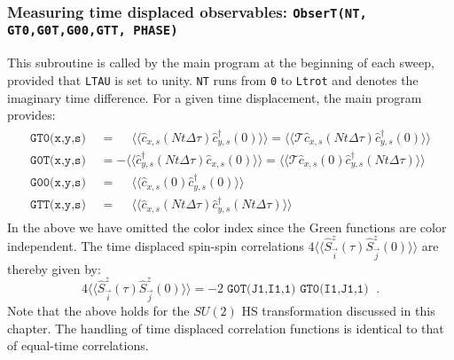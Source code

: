 \subsubsection{Measuring time displaced observables: \texttt{ObserT(NT,  GT0,G0T,G00,GTT, PHASE) }}
%
This subroutine is called by the main program at the beginning of each sweep, provided that \texttt{LTAU}  is set to unity.  \texttt{NT} runs from \texttt{0}  to \texttt{Ltrot} and denotes the   imaginary time difference.   For a given time  displacement, the main program provides:
\begin{align}
\begin{aligned}
\texttt{GT0(x,y,s) }  &=   \phantom{+} \langle \langle \hat{c}^{\phantom\dagger}_{x,s} (Nt \Delta \tau)   \hat{c}^{\dagger}_{y,s} (0)   \rangle \rangle = \langle \langle \mathcal{T} \hat{c}^{\phantom\dagger}_{x,s} (Nt \Delta \tau)   \hat{c}^{\dagger}_{y,s} (0)   \rangle \rangle   \\
\texttt{G0T(x,y,s) }   &=  -   \langle \langle   \hat{c}^{\dagger}_{y,s} (Nt \Delta \tau)    \hat{c}^{\phantom\dagger}_{x,s} (0)    \rangle \rangle =
    \langle \langle \mathcal{T} \hat{c}^{\phantom\dagger}_{x,s} (0)    \hat{c}^{\dagger}_{y,s} (Nt \Delta \tau)   \rangle \rangle    \\
  \texttt{G00(x,y,s) }  &=    \phantom{+} \langle \langle \hat{c}^{\phantom\dagger}_{x,s} (0)   \hat{c}^{\dagger}_{y,s} (0)   \rangle \rangle     \\
    \texttt{GTT(x,y,s) }  &=   \phantom{+} \langle \langle \hat{c}^{\phantom\dagger}_{x,s} (Nt \Delta \tau)   \hat{c}^{\dagger}_{y,s} (Nt \Delta \tau)   \rangle \rangle    
\end{aligned}
\end{align}
In the above we have omitted the color index since  the  Green functions are color independent.  The time displaced  spin-spin correlations 
$ 4 \langle \langle \hat{S}^{z}_{\vec{i}} (\tau)  \hat{S}^{z}_{\vec{j}} (0)\rangle \rangle   $ 
are thereby given by: 
\begin{equation}
	4 \langle \langle \hat{S}^{z}_{\vec{i}} (\tau)  \hat{S}^{z}_{\vec{j}} (0)\rangle \rangle   = - 2 \; \texttt{G0T(J1,I1,1) } \texttt{GT0(I1,J1,1) } \;.
\end{equation}
Note that the above holds for the $SU(2)$ HS transformation discussed in this chapter. 
The handling of time displaced correlation functions is identical to that of equal-time correlations. 

